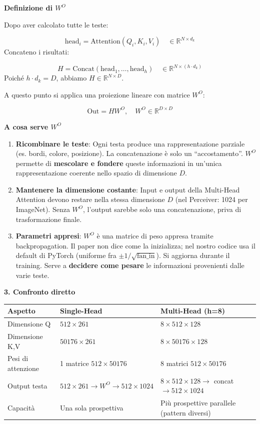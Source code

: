 \documentclass[
  11pt,
]{article}
\begin{document}
\textbf{Definizione di $W^O$}

Dopo aver calcolato tutte le teste:

\[
\text{head}_i = \text{Attention}(Q_i, K_i, V_i) \quad \in \mathbb{R}^{N \times d_k}
\]
Concateno i risultati:

\[
H = \text{Concat}(\text{head}_1, \ldots, \text{head}_h) \quad \in \mathbb{R}^{N \times (h \cdot d_k)}
\]
Poiché $h \cdot d_k = D$, abbiamo $H \in \mathbb{R}^{N \times D}$.

A questo punto si applica una proiezione lineare con matrice $W^O$:

\[
\text{Out} = H W^O, \quad W^O \in \mathbb{R}^{D \times D}
\]

\textbf{A cosa serve $W^O$}
\begin{enumerate}
\item \textbf{Ricombinare le teste}: Ogni testa produce una rappresentazione parziale (es. bordi, colore, posizione). La concatenazione è solo un ``accostamento''. $W^O$ permette di \textbf{mescolare e fondere} queste informazioni in un'unica rappresentazione coerente nello spazio di dimensione $D$.
\item \textbf{Mantenere la dimensione costante}: Input e output della Multi-Head Attention devono restare nella stessa dimensione $D$ (nel Perceiver: 1024 per ImageNet). Senza $W^O$, l'output sarebbe solo una concatenazione, priva di trasformazione finale.
\item \textbf{Parametri appresi}: $W^O$ è una matrice di peso appresa tramite backpropagation. Il paper non dice come la inizializza; nel nostro codice usa il default di PyTorch (uniforme fra $\pm 1/\sqrt{\text{fan\_in}}$). Si aggiorna durante il training. Serve a \textbf{decidere come pesare} le informazioni provenienti dalle varie teste.
\end{enumerate}

\textbf{3. Confronto diretto}

\begin{center}
\begin{tabular}{l l l}
\hline
\textbf{Aspetto} & \textbf{Single-Head} & \textbf{Multi-Head (h=8)} \\
\hline
Dimensione Q & $512 \times 261$ & $8 \times 512 \times 128$ \\
Dimensione K,V & $50176 \times 261$ & $8 \times 50176 \times 128$ \\
Pesi di attenzione & 1 matrice $512 \times 50176$ & 8 matrici $512 \times 50176$ \\
Output testa & $512 \times 261 \to W^O \to 512 \times 1024$ & $8 \times 512 \times 128 \to$ concat $\to 512 \times 1024$ \\
Capacità & Una sola prospettiva & Più prospettive parallele (pattern diversi) \\
\hline
\end{tabular}
\end{center}
\end{document}
